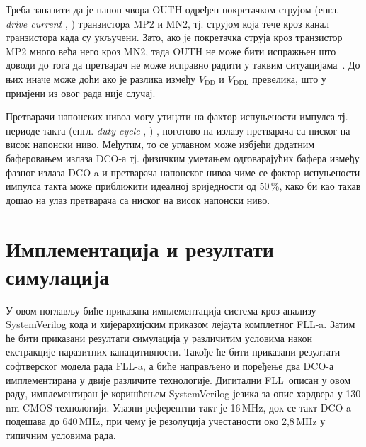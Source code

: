 \documentclass[master]{finthesis}
\makeatletter
\newcommand*{\engl}[2][\@empty]{%
    \edef\theacronym{#1}%
    (енгл. \foreignlanguage{english}{\emph{#2}%
    \ifx\theacronym\@empty \else , #1\fi})%
}
\def \FLL  {FLL} %
\def \DCO  {DCO} %
\makeatother
\begin{document}
Треба запазити да је напон чвора OUTH одређен покретачком струјом \engl{drive current} транзисторa MP2 и MN2, тј. струјом која тече кроз канал транзистора када су укључени. Зато, ако је покретачка струја кроз транзистор MP2 много већа него кроз MN2, тада OUTH не може бити испражњен што доводи до тога да претварач не може исправно радити у таквим ситуацијама~\cite{Osaki:6198744}. До њих иначе може доћи ако је разлика између $V_\text{DD}$ и $V_\text{DDL}$ превелика, што у примјени из овог рада није случај. \par
Претварачи напонских нивоа могу утицати на фактор испуњености импулса тј. периоде такта \engl{duty cycle}, поготово на излазу претварача са ниског на висок напонски ниво. Међутим, то се углавном може избјећи додатним баферовањем излаза \DCO-а тј. физичким уметањем одговарајућих бафера између фазног излаза \DCO-a и претварача напонског нивоа чиме се фактор испуњености импулса такта може приближити идеалној вриједности од 50\,\%, како би као такав дошао на улаз претварача са ниског на висок напонски ниво.


\section{Имплементација и резултати симулација} \label{Implementation and results}
У овом поглављу биће приказана имплементација система кроз анализу SystemVerilog кода и хијерархијским приказом лејаута комплетног \FLL-a. Затим ће бити приказани резултати симулација у различитим условима након екстракције паразитних капацитивности. Такође ће бити приказани резултати софтверског модела рада \FLL-a, а биће направљено и поређење два \DCO-а имплементирана у двије различите технологије. Дигитални \FLL\ описан у овом раду, имплементиран је коришћењем SystemVerilog језика за опис хардвера у 130\,nm CMOS технологији. Улазни референтни такт је 16\,MHz, док се такт \DCO-a подешава до 640\,MHz, при чему је резолуција учестаности око 2,8\,MHz у типичним условима рада. 
\end{document}
